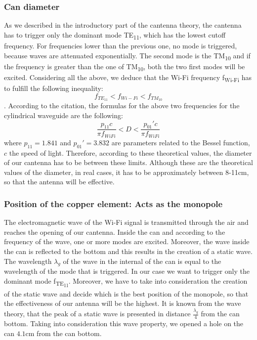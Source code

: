\documentclass[12pt,a4paper]{article}
\begin{document}
	\subsubsection{Can diameter}
		As we described in the introductory part of the cantenna theory, the cantenna has to trigger only the dominant mode TE\textsubscript{11}, which has the lowest cutoff frequency. For frequencies lower than the previous one, no mode is triggered, because waves are attenuated exponentially. The second mode is the TM\textsubscript{10} and if the frequency is greater than the one of TM\textsubscript{10}, both the two first modes will be excited. Considering all the above, we deduce that the Wi-Fi frequency f\textsubscript{Wi-Fi} has to fulfill the following inequality:
		\begin{equation}
			f_{TE_{11}} < f_{Wi-Fi} < f_{TM_{10}}
		\end{equation}
		.
		According to the citation\cite{waveguide}, the formulas for the above two frequencies for the cylindrical waveguide are the following:
		\begin{equation}
			\frac{p_{11} c}{\pi f_{WiFi}} < D < \frac{p_{01}' c}{\pi f_{WiFi}}
		\end{equation}
		where $p_{11} = 1.841$ and $p_{01}'= 3.832$ are parameters related to the Bessel function, $c$ the speed of light.
		Therefore, according to these theoretical values, the diameter of our cantenna has to be between these limits. Although these are the theoretical values of the diameter, in real cases, it has to be approximately between 8-11cm, so that the antenna will be effective.
		
	\subsubsection{Position of the copper element: Acts as the monopole}
	
		The electromagnetic wave of the Wi-Fi signal is transmitted through the air and reaches the opening of our cantenna. Inside the can and according to the frequency of the wave, one or more modes are excited. Moreover, the wave inside the can is reflected to the bottom and this results in the creation of a static wave. The wavelength $\lambda_g$ of the wave in the internal of the can is equal to the wavelength of the mode that is triggered. In our case we want to trigger only the dominant mode f\textsubscript{TE\textsubscript{11}}. Moreover, we have to take into consideration the creation of the static wave and decide which is the best position of the monopole, so that the effectiveness of our antenna will be the highest. It is known from the wave theory, that the peak of a static wave is presented in distance $\frac{\lambda_g}{4}$ from the can bottom. Taking into consideration this wave property, we opened a hole on the can $4.1$cm from the can bottom. 
	
\end{document}
